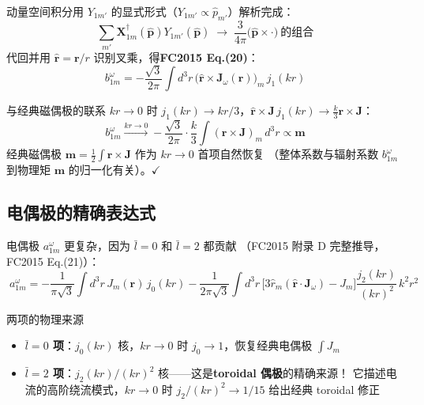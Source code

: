 动量空间积分用 $Y_{1m'}$ 的显式形式（$Y_{1m'}\propto\hat{p}_{m'}$）解析完成：
\begin{equation}
  \sum_{m'}\mathbf{X}^\dagger_{1m}(\hat{\mathbf{p}})Y_{1m'}(\hat{\mathbf{p}})
  \;\longrightarrow\;
  \frac{3}{4\pi}\bigl(\hat{\mathbf{p}}\times\cdot\bigr)\ \text{的组合}
\end{equation}
代回并用 $\hat{\mathbf{r}}=\mathbf{r}/r$ 识别叉乘，得\textbf{FC2015 Eq.(20)}：
\begin{equation}
  \boxed{\;
  b^\omega_{1m} = -\frac{\sqrt{3}}{2\pi}\int d^3r\,
    \bigl(\hat{\mathbf{r}}\times\mathbf{J}_\omega(\mathbf{r})\bigr)_m\,j_1(kr)
  \;}
  \label{eq:fc_bmd}
\end{equation}

\begin{stepbox}{与经典磁偶极的联系}
$kr\to0$ 时 $j_1(kr)\to kr/3$，$\hat{\mathbf{r}}\times\mathbf{J}\,j_1(kr)
\to \frac{k}{3}\mathbf{r}\times\mathbf{J}$：
\begin{equation}
  b^\omega_{1m} \xrightarrow{kr\to0}
  -\frac{\sqrt{3}}{2\pi}\cdot\frac{k}{3}\int(\mathbf{r}\times\mathbf{J})_m\,d^3r
  \propto \mathbf{m}
\end{equation}
经典磁偶极 $\mathbf{m}=\frac12\int\mathbf{r}\times\mathbf{J}$ 作为 $kr\to0$ 首项自然恢复
（整体系数与辐射系数 $b^\omega_{1m}$ 到物理矩 $\mathbf{m}$ 的归一化有关）。$\checkmark$
\end{stepbox}

\subsection{电偶极的精确表达式}

电偶极 $a^\omega_{1m}$ 更复杂，因为 $\bar{l}=0$ 和 $\bar{l}=2$ 都贡献
（FC2015 附录 D 完整推导，FC2015 Eq.(21)）：
\begin{equation}
  \boxed{\;
  a^\omega_{1m} = -\frac{1}{\pi\sqrt{3}}\int d^3r\,J_{m}(\mathbf{r})\,j_0(kr)
    - \frac{1}{2\pi\sqrt{3}}\int d^3r\,
    \bigl[3\hat{r}_m(\hat{\mathbf{r}}\cdot\mathbf{J}_\omega) - J_{m}\bigr]\frac{j_2(kr)}{(kr)^2}\,k^2r^2
  \;}
  \label{eq:fc_emd}
\end{equation}

\begin{stepbox}{两项的物理来源}
\begin{itemize}
  \item \textbf{$\bar{l}=0$ 项}：$j_0(kr)$ 核，$kr\to0$ 时 $j_0\to1$，恢复经典电偶极 $\int J_m$
  \item \textbf{$\bar{l}=2$ 项}：$j_2(kr)/(kr)^2$ 核——这是\textbf{toroidal 偶极}的精确来源！
    它描述电流的高阶绕流模式，$kr\to0$ 时 $j_2/(kr)^2\to1/15$ 给出经典 toroidal 修正
\end{itemize}
\end{stepbox}

